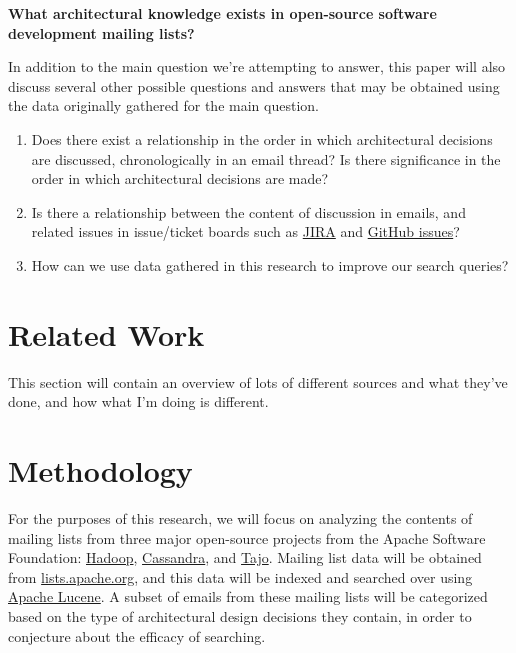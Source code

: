 \documentclass[a4paper, 12pt]{article}
\begin{document}
		\large \textbf{What architectural knowledge exists in open-source software development mailing lists?}
		\normalsize
		
		In addition to the main question we're attempting to answer, this paper will also discuss several other possible questions and answers that may be obtained using the data originally gathered for the main question.
		
		\begin{enumerate}
			\item Does there exist a relationship in the order in which architectural decisions are discussed, chronologically in an email thread? Is there significance in the order in which architectural decisions are made?
			
			\item Is there a relationship between the content of discussion in emails, and related issues in issue/ticket boards such as \href{https://www.atlassian.com/software/jira}{JIRA} and \href{https://github.com/features/issues}{GitHub issues}?
			
			\item How can we use data gathered in this research to improve our search queries?
		\end{enumerate}
	
\section{Related Work}
	This section will contain an overview of lots of different sources and what they've done, and how what I'm doing is different.

\section{Methodology}
	For the purposes of this research, we will focus on analyzing the contents of mailing lists from three major open-source projects from the Apache Software Foundation: \href{https://hadoop.apache.org/}{Hadoop}, \href{https://cassandra.apache.org}{Cassandra}, and \href{https://attic.apache.org/projects/tajo.html}{Tajo}. Mailing list data will be obtained from \href{https://lists.apache.org/}{lists.apache.org}, and this data will be indexed and searched over using \href{https://lucene.apache.org/}{Apache Lucene}. A subset of emails from these mailing lists will be categorized based on the type of architectural design decisions they contain, in order to conjecture about the efficacy of searching.
	
\end{document}
